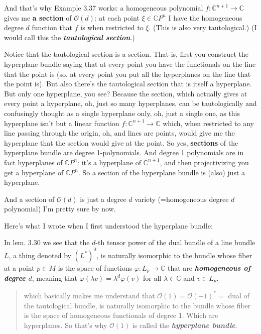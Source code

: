 And that's why \cite{lec} Example 3.37 works: a homogeneous polynomial \(f: \mathbb{C}^{n+1}\to \mathbb{C}\) gives me \textbf{a section} of \(\mathcal{O}(d)\): at each point \(\xi \in \mathbb{C}P^{n}\) I have the homogeneous degree \(d\) function that \(f\) is when restricted to \(\xi\). (This is also very tautological.) (I would call this the \textit{\textbf{tautological section}}.)

Notice that the tautological section is a section. That is, first you construct the hyperplane bundle saying that at every point you have the functionals on the line that the point is (so, at every point you put all the hyperplanes on the line that the point is). But also there's the tautological section that is itself a hyperplane. But only one hyperplane, you see? Because the section, which actually gives at every point a hyperplane, oh, just so many hyperplanes, can be tautologically and confusingly thought as a single hyperplane only, oh, just a single one, as this hyperplane isn't but a linear function \(f:\mathbb{C}^{n+1}\to \mathbb{C}\) which, when restricted to any line passing through the origin, oh, and lines are points, would give me the hyperplane that the section would give at the point. So yes, \textbf{sections} of the hyperplane bundle are degree 1-polynomials. And degree 1 polynomials are in fact hyperplanes of \(\mathbb{C}P^n\): it's a hyperplane of \(\mathbb{C}^{n+1}\), and then projectivizing you get a hyperplane of \(\mathbb{C}P^n\). So a section of the hyperplane bundle is (also) just a hyperplane.

And a section of \(\mathcal{O}(d)\) is just a degree \(d\) variety (=homogeneous degree \(d\) polynomial) I'm pretty sure by now.


Here's what I wrote when I first understood the hyperplane bundle:

In lem. 3.30 \cite{lec} we see that the $d$-th tensor power of the dual bundle of a line bundle $L$, a thing denoted by $(L^*)^d$, is naturally isomorphic to the bundle whose fiber at a point $p \in M$ is the space of functions $\varphi:L_p\to \mathbb{C}$ that are \textit{\textbf{homogeneous of degree $d$}}, meaning that $\varphi(\lambda v)=\lambda^d \varphi(v)$ for all $\lambda \in \mathbb{C}$ and $v \in L_p$.

\begin{quotation}
	which basically makes me understand that $\mathcal{O}(1)=\mathcal{O}(-1)^*=$ dual of the tautological bundle, is naturally isomorphic to the bundle whose fiber is the space of homogeneous functionals of degree 1. Which are hyperplanes. So that's why $\mathcal{O}(1)$ is called the \textit{\textbf{hyperplane bundle}}.
\end{quotation}


